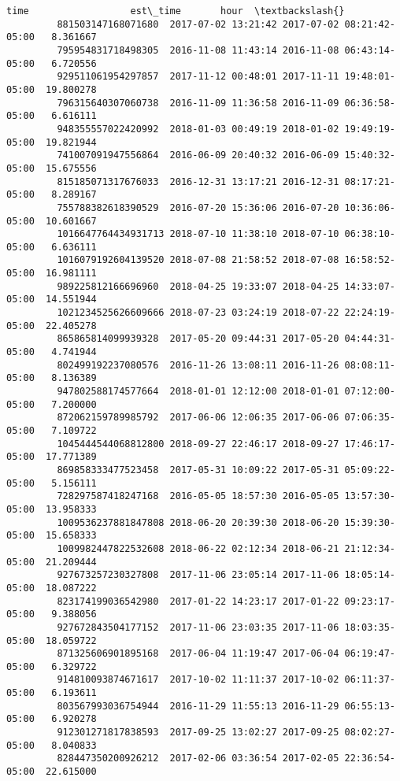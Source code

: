\documentclass[11pt]{article}
\begin{document}
\begin{Verbatim}[commandchars=\\\{\}]
                                            time                  est\_time       hour  \textbackslash{}
         881503147168071680  2017-07-02 13:21:42 2017-07-02 08:21:42-05:00   8.361667   
         795954831718498305  2016-11-08 11:43:14 2016-11-08 06:43:14-05:00   6.720556   
         929511061954297857  2017-11-12 00:48:01 2017-11-11 19:48:01-05:00  19.800278   
         796315640307060738  2016-11-09 11:36:58 2016-11-09 06:36:58-05:00   6.616111   
         948355557022420992  2018-01-03 00:49:19 2018-01-02 19:49:19-05:00  19.821944   
         741007091947556864  2016-06-09 20:40:32 2016-06-09 15:40:32-05:00  15.675556   
         815185071317676033  2016-12-31 13:17:21 2016-12-31 08:17:21-05:00   8.289167   
         755788382618390529  2016-07-20 15:36:06 2016-07-20 10:36:06-05:00  10.601667   
         1016647764434931713 2018-07-10 11:38:10 2018-07-10 06:38:10-05:00   6.636111   
         1016079192604139520 2018-07-08 21:58:52 2018-07-08 16:58:52-05:00  16.981111   
         989225812166696960  2018-04-25 19:33:07 2018-04-25 14:33:07-05:00  14.551944   
         1021234525626609666 2018-07-23 03:24:19 2018-07-22 22:24:19-05:00  22.405278   
         865865814099939328  2017-05-20 09:44:31 2017-05-20 04:44:31-05:00   4.741944   
         802499192237080576  2016-11-26 13:08:11 2016-11-26 08:08:11-05:00   8.136389   
         947802588174577664  2018-01-01 12:12:00 2018-01-01 07:12:00-05:00   7.200000   
         872062159789985792  2017-06-06 12:06:35 2017-06-06 07:06:35-05:00   7.109722   
         1045444544068812800 2018-09-27 22:46:17 2018-09-27 17:46:17-05:00  17.771389   
         869858333477523458  2017-05-31 10:09:22 2017-05-31 05:09:22-05:00   5.156111   
         728297587418247168  2016-05-05 18:57:30 2016-05-05 13:57:30-05:00  13.958333   
         1009536237881847808 2018-06-20 20:39:30 2018-06-20 15:39:30-05:00  15.658333   
         1009982447822532608 2018-06-22 02:12:34 2018-06-21 21:12:34-05:00  21.209444   
         927673257230327808  2017-11-06 23:05:14 2017-11-06 18:05:14-05:00  18.087222   
         823174199036542980  2017-01-22 14:23:17 2017-01-22 09:23:17-05:00   9.388056   
         927672843504177152  2017-11-06 23:03:35 2017-11-06 18:03:35-05:00  18.059722   
         871325606901895168  2017-06-04 11:19:47 2017-06-04 06:19:47-05:00   6.329722   
         914810093874671617  2017-10-02 11:11:37 2017-10-02 06:11:37-05:00   6.193611   
         803567993036754944  2016-11-29 11:55:13 2016-11-29 06:55:13-05:00   6.920278   
         912301271817838593  2017-09-25 13:02:27 2017-09-25 08:02:27-05:00   8.040833   
         828447350200926212  2017-02-06 03:36:54 2017-02-05 22:36:54-05:00  22.615000   

\end{Verbatim}
\end{document}
